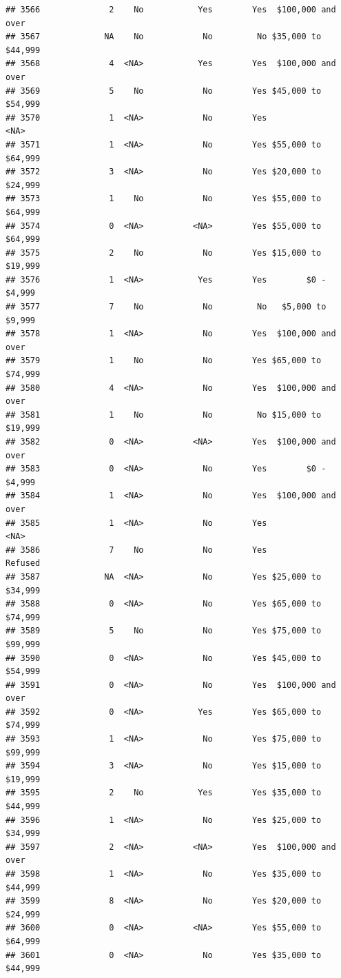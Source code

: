 \documentclass[man]{apa6}
\begin{document}
\begin{verbatim}
## 3566              2    No           Yes        Yes  $100,000 and over
## 3567             NA    No            No         No $35,000 to $44,999
## 3568              4  <NA>           Yes        Yes  $100,000 and over
## 3569              5    No            No        Yes $45,000 to $54,999
## 3570              1  <NA>            No        Yes               <NA>
## 3571              1  <NA>            No        Yes $55,000 to $64,999
## 3572              3  <NA>            No        Yes $20,000 to $24,999
## 3573              1    No            No        Yes $55,000 to $64,999
## 3574              0  <NA>          <NA>        Yes $55,000 to $64,999
## 3575              2    No            No        Yes $15,000 to $19,999
## 3576              1  <NA>           Yes        Yes        $0 - $4,999
## 3577              7    No            No         No   $5,000 to $9,999
## 3578              1  <NA>            No        Yes  $100,000 and over
## 3579              1    No            No        Yes $65,000 to $74,999
## 3580              4  <NA>            No        Yes  $100,000 and over
## 3581              1    No            No         No $15,000 to $19,999
## 3582              0  <NA>          <NA>        Yes  $100,000 and over
## 3583              0  <NA>            No        Yes        $0 - $4,999
## 3584              1  <NA>            No        Yes  $100,000 and over
## 3585              1  <NA>            No        Yes               <NA>
## 3586              7    No            No        Yes            Refused
## 3587             NA  <NA>            No        Yes $25,000 to $34,999
## 3588              0  <NA>            No        Yes $65,000 to $74,999
## 3589              5    No            No        Yes $75,000 to $99,999
## 3590              0  <NA>            No        Yes $45,000 to $54,999
## 3591              0  <NA>            No        Yes  $100,000 and over
## 3592              0  <NA>           Yes        Yes $65,000 to $74,999
## 3593              1  <NA>            No        Yes $75,000 to $99,999
## 3594              3  <NA>            No        Yes $15,000 to $19,999
## 3595              2    No           Yes        Yes $35,000 to $44,999
## 3596              1  <NA>            No        Yes $25,000 to $34,999
## 3597              2  <NA>          <NA>        Yes  $100,000 and over
## 3598              1  <NA>            No        Yes $35,000 to $44,999
## 3599              8  <NA>            No        Yes $20,000 to $24,999
## 3600              0  <NA>          <NA>        Yes $55,000 to $64,999
## 3601              0  <NA>            No        Yes $35,000 to $44,999

\end{verbatim}
\end{document}
